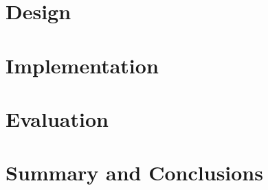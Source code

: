 \documentclass[
	12pt,
	a4paper,
	BCOR10mm,
	DIV14,
	headsepline,
]{scrreprt}
\begin{document}
\chapter{Design}
\label{c:des}

\chapter{Implementation}
\label{c:impl}

\chapter{Evaluation}
\label{c:eval}

\chapter{Summary and Conclusions}
\label{c:sac}
\end{document}
